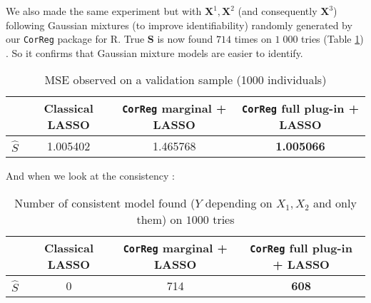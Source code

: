 \documentclass[12pt,a4paper]{report}
\begin{document}
		We also made the same experiment but with $\boldsymbol{X}^1,\boldsymbol{X}^2$ (and consequently $\boldsymbol{X}^3$) following Gaussian mixtures (to improve identifiability) randomly generated by our {\tt CorReg} package for R. 
		True $\boldsymbol{S}$ is now found $714$ times on $1\;000$ tries (Table \ref{testidentifiableGM}) . So it confirms that Gaussian mixture models are easier to identify.
		
		
		\begin{table}[h!]
		\centering
		\begin{tabular}{|c|c|c|c|}
		\hline 
		 & Classical LASSO & {\tt CorReg} marginal + LASSO& {\tt CorReg} full plug-in + LASSO \\ 
     	\hline 
		$\hat{S}$ & 1.005402 & 1.465768 & \textbf{1.005066} \\ 
		\hline 
		\end{tabular} 
		\caption{MSE observed on a validation sample (1000 individuals)}
		\end{table}

		And when we look at the consistency :
		\begin{table}[h!]
		\centering	
		\begin{tabular}{|c|c|c|c|}
		\hline 
		 & Classical LASSO & {\tt CorReg} marginal + LASSO& {\tt CorReg} full plug-in  + LASSO \\ 
		\hline 
		$\hat{S}$ & 0 & 714 & \textbf{608} \\ 
		\hline 
		\end{tabular} 
		\caption{Number of consistent model found ($Y$ depending on $X_1,X_2$ and only them) on $1000$ tries}\label{testidentifiableGM}
		\end{table}				
				
		
		
\end{document}
